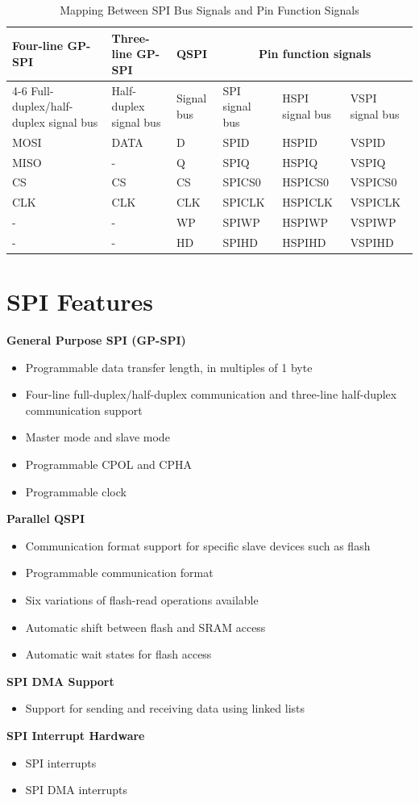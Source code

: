 \documentclass[main\_\_EN.tex]{subfiles}
\begin{document}
\begin{longtable}[c]{|p{3cm}|p{3cm}|p{2.5cm}|p{2cm}|p{2cm}|p{2cm}|}
    \caption{Mapping Between SPI Bus Signals and Pin Function Signals}
    \label{table:SPI_signals}\\
    \hline
    \rowcolor{lightgray}
    Four-line GP-SPI & Three-line GP-SPI & QSPI & \multicolumn{3}{c|}{Pin function signals}\\
    \cline{4-6}
    \rowcolor{lightgray}
   Full-duplex/half-duplex signal bus & Half-duplex signal bus & Signal bus & SPI signal bus & HSPI signal bus & VSPI signal bus\\
    \hline
    MOSI & DATA & D  & SPID  & HSPID  & VSPID\\
    \hline
    MISO & -    & Q  & SPIQ  & HSPIQ  & VSPIQ\\
    \hline
      CS & CS   & CS & SPICS0& HSPICS0& VSPICS0\\
    \hline
     CLK & CLK  & CLK& SPICLK& HSPICLK& VSPICLK\\
    \hline
       - & -    & WP & SPIWP & HSPIWP & VSPIWP\\
    \hline
       - & -    & HD & SPIHD & HSPIHD & VSPIHD\\
    \hline
\end{longtable}


\section{SPI Features}
{\bfseries General Purpose SPI (GP-SPI)}
\begin{itemize}
    \item Programmable data transfer length, in multiples of 1 byte
    \item Four-line full-duplex/half-duplex communication and three-line half-duplex communication support
     \item Master mode and slave mode
    \item Programmable CPOL and CPHA
    \item Programmable clock
\end{itemize}
{\bfseries Parallel QSPI}
\begin{itemize}
    \item Communication format support for specific slave devices such as flash
    \item Programmable communication format
    \item Six variations of flash-read operations available
    \item Automatic shift between flash and SRAM access
    \item Automatic wait states for flash access
\end{itemize}
{\bfseries SPI DMA Support}
\begin{itemize}
    \item Support for sending and receiving data using linked lists
\end{itemize}
{\bfseries SPI Interrupt Hardware}
\begin{itemize}
    \item SPI interrupts
    \item SPI DMA interrupts
\end{itemize}
\end{document}
